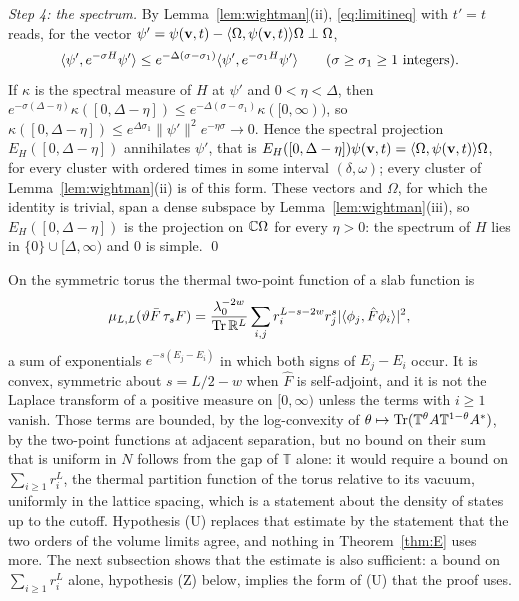 \emph{Step 4: the spectrum.} By Lemma~\ref{lem:wightman}(ii),
\eqref{eq:limitineq} with $t'=t$ reads, for the vector $\psi'=\psi(\mathbf v,t)
-\langle \Omega,\psi(\mathbf v,t)\rangle\Omega\perp\Omega$,
\[
\langle \psi',e^{-\sigma H}\psi'\rangle\le e^{-\Delta(\sigma-\sigma_1)}\langle \psi',e^{-\sigma_1H}\psi'\rangle
\qquad(\sigma\ge\sigma_1\ge1\text{ integers}).
\]
If $\kappa$ is the spectral measure of $H$ at $\psi'$ and $0<\eta<\Delta$,
then $e^{-\sigma(\Delta-\eta)}\kappa([0,\Delta-\eta])\le e^{-\Delta(\sigma-\sigma_1)}
\kappa([0,\infty))$, so $\kappa([0,\Delta-\eta])\le e^{\Delta\sigma_1}\|\psi'\|^2
e^{-\eta\sigma}\to0$. Hence the spectral projection $E_H([0,\Delta-\eta])$
annihilates $\psi'$, that is $E_H([0,\Delta-\eta])\psi(\mathbf v,t)=
\langle \Omega,\psi(\mathbf v,t)\rangle\Omega$, for every cluster with ordered times in
some interval $(\delta,\omega)$; every cluster of Lemma~\ref{lem:wightman}(ii)
is of this form. These vectors and $\Omega$, for which the identity is
trivial, span a dense subspace by Lemma~\ref{lem:wightman}(iii), so
$E_H([0,\Delta-\eta])$ is the projection on $\mathbb{C}\Omega$ for every $\eta>0$:
the spectrum of $H$ lies in $\{0\}\cup[\Delta,\infty)$ and $0$ is simple.
\qed

\begin{remark}\label{rem:thermal}
On the symmetric torus the thermal two-point function of a slab function is
\[
\mu_{L,L}(\vartheta\bar F\,\tau_sF)=\frac{\lambda_0^{-2w}}{\operatorname{Tr}\mathbb R^L}
\sum_{i,j}r_i^{L-s-2w}r_j^{s}|\langle \phi_j,\hat F\phi_i\rangle|^2,
\]
a sum of exponentials $e^{-s(E_j-E_i)}$ in which both signs of $E_j-E_i$
occur. It is convex, symmetric about $s=L/2-w$ when $\hat F$ is self-adjoint,
and it is not the Laplace transform of a positive measure on $[0,\infty)$
unless the terms with $i\ge1$ vanish. Those terms are bounded, by the log-convexity of
$\theta\mapsto\operatorname{Tr}(\mathbb T^{\theta}A\mathbb T^{1-\theta}A^*)$, by the
two-point functions at adjacent separation, but no bound on their sum that
is uniform in $N$ follows from the gap of $\mathbb T$ alone: it would require
a bound on $\sum_{i\ge1}r_i^{L}$, the thermal partition function of the
torus relative to its vacuum, uniformly in the lattice spacing, which is a
statement about the density of states up to the cutoff. Hypothesis (U)
replaces that estimate by the statement that the two orders of the volume
limits agree, and nothing in Theorem~\ref{thm:E} uses more. The next
subsection shows that the estimate is also sufficient: a bound on
$\sum_{i\ge1}r_i^L$ alone, hypothesis (Z) below, implies the form of (U)
that the proof uses.
\end{remark}

